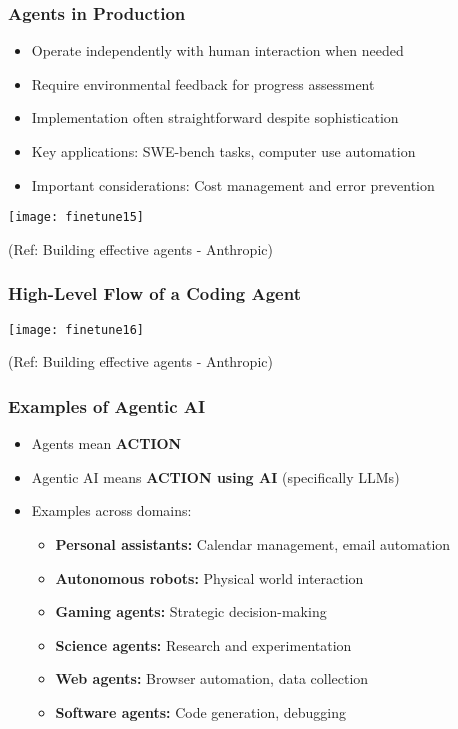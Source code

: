 \begin{frame}[fragile]\frametitle{Agents in Production}
\begin{itemize}
    \item Operate independently with human interaction when needed
    \item Require environmental feedback for progress assessment
    \item Implementation often straightforward despite sophistication
    \item Key applications: SWE-bench tasks, computer use automation
    \item Important considerations: Cost management and error prevention
\end{itemize}

\begin{center}
\texttt{[image: finetune15]}
\end{center}

{\tiny (Ref: Building effective agents - Anthropic)}
\end{frame}

\begin{frame}[fragile]\frametitle{High-Level Flow of a Coding Agent}
\begin{center}
\texttt{[image: finetune16]}
\end{center}

{\tiny (Ref: Building effective agents - Anthropic)}
\end{frame}

\begin{frame}[fragile]\frametitle{Examples of Agentic AI}
\begin{itemize}
    \item Agents mean \textbf{ACTION}
    \item Agentic AI means \textbf{ACTION using AI} (specifically LLMs)
    \item Examples across domains:
    \begin{itemize}
        \item \textbf{Personal assistants:} Calendar management, email automation
        \item \textbf{Autonomous robots:} Physical world interaction
        \item \textbf{Gaming agents:} Strategic decision-making
        \item \textbf{Science agents:} Research and experimentation
        \item \textbf{Web agents:} Browser automation, data collection
        \item \textbf{Software agents:} Code generation, debugging
    \end{itemize}
\end{itemize}
\end{frame}

